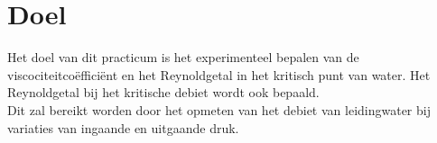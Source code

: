 \section{Doel}

Het doel van dit practicum is het experimenteel bepalen van de viscociteitco\"effici\"ent 
en het Reynoldgetal in het kritisch punt van water. Het Reynoldgetal bij het kritische debiet wordt ook bepaald.\\

Dit zal bereikt worden door het opmeten van het debiet van 
leidingwater bij variaties van ingaande en uitgaande 
druk.
